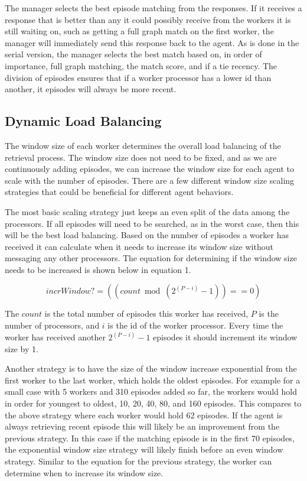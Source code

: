 \documentclass[11pt]{article} %
\begin{document}
The manager selects the best episode matching from the responses. If it receives
a response that is better than any it could possibly receive from the workers it
is still waiting on, such as getting a full graph match on the first worker, the
manager will immediately send this response back to the agent. As is done in the
serial version, the manager selects the best match based on, in order of
importance, full graph matching, the match score, and if a tie recency. The
division of episodes ensures that if a worker processor has a lower id than
another, it episodes will always be more recent.

\subsection{Dynamic Load Balancing}

The window size of each worker determines the overall load balancing of the
retrieval process. The window size does not need to be fixed, and as we are
continuously adding episodes, we can increase the window size for each agent to
scale with the number of episodes. There are a few different window size scaling
strategies that could be beneficial for different agent behaviors.

The most basic scaling strategy just keeps an even split of the data among the
processors. If all episodes will need to be searched, as in the worst case, then
this will be the best load balancing. Based on the number of episodes a worker
has received it can calculate when it needs to increase its window size without
messaging any other processors. The equation for determining if the window size
needs to be increased is shown below in equation 1.

\begin{equation}
incrWindow? = ((count  \bmod  (2^{(P-i)} -1) ) == 0)
\end{equation}

The $count$ is the total number of episodes this worker has received, $P$ is the
number of processors, and $i$ is the id of the worker processor. Every time the
worker has received another $ 2^(P-i) -1 $ episodes it should increment its window
size by 1.

Another strategy is to have the size of the window increase exponential from the
first worker to the last worker, which holds the oldest episodes. For example
for a small case with 5 workers and 310 episodes added so far, the workers would
hold in order for youngest to oldest, 10, 20, 40, 80, and 160 episodes. This
compares to the above strategy where each worker would hold 62 episodes. If the
agent is always retrieving recent episode this will likely be an improvement
from the previous strategy. In this case if the matching episode is in the first
70 episodes, the exponential window size strategy will likely finish before an
even window strategy. Similar to the equation for the previous strategy, the
worker can determine when to increase its window size.
\end{document}
